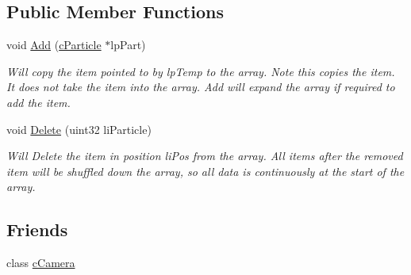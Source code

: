 \subsection*{Public Member Functions}
\begin{DoxyCompactItemize}
\item 
\hypertarget{classc_particle_handler_a4bc35761a9e607debe3f9ab6d3c09c69}{
void \hyperlink{classc_particle_handler_a4bc35761a9e607debe3f9ab6d3c09c69}{Add} (\hyperlink{classc_particle}{cParticle} $\ast$lpPart)}
\label{classc_particle_handler_a4bc35761a9e607debe3f9ab6d3c09c69}

\begin{DoxyCompactList}\small\item\em Will copy the item pointed to by lpTemp to the array. Note this copies the item. It does not take the item into the array. Add will expand the array if required to add the item. \end{DoxyCompactList}\item 
\hypertarget{classc_particle_handler_ada64d26bf581756c5ecba3a480e678e5}{
void \hyperlink{classc_particle_handler_ada64d26bf581756c5ecba3a480e678e5}{Delete} (uint32 liParticle)}
\label{classc_particle_handler_ada64d26bf581756c5ecba3a480e678e5}

\begin{DoxyCompactList}\small\item\em Will Delete the item in position liPos from the array. All items after the removed item will be shuffled down the array, so all data is continuously at the start of the array. \end{DoxyCompactList}\end{DoxyCompactItemize}
\subsection*{Friends}
\begin{DoxyCompactItemize}
\item 
\hypertarget{classc_particle_handler_aaaa2c7b7268370d591d4e51897862561}{
class \hyperlink{classc_particle_handler_aaaa2c7b7268370d591d4e51897862561}{cCamera}}
\label{classc_particle_handler_aaaa2c7b7268370d591d4e51897862561}

\end{DoxyCompactItemize}


